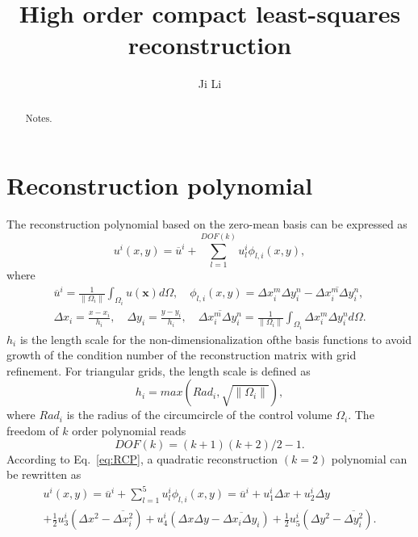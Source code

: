 \documentclass[review]{elsarticle}
\begin{document}
\begin{frontmatter}
	
\title{High order compact least-squares reconstruction}
\author{Ji Li}


\address{National Key Laboratory of Science and Technology on Aerodynamic Design and Research, Northwestern Polytechnical 
University, Xi'an, Shaanxi 710072, China}

\begin{abstract}
	Notes.
\end{abstract}
\end{frontmatter}

\section{Reconstruction polynomial}
The reconstruction polynomial based on the zero-mean basis can be expressed as 
\begin{equation}\label{eq:RCP}
	u^i(x,y)=\overline{u}^i+\sum_{l=1}^{DOF(k)}u^i_l\phi_{l,i}(x, y),
\end{equation}
where 
\begin{equation*}
	\begin{gathered}
		\overline{u}^i=\frac{1}{\|\Omega_i\|}\int_{\Omega_i}u(\bm{x})d\Omega,
		\quad \phi_{l,i}(x,y)=\Delta x^m_i\Delta y^n_i-\overline{\Delta x^m_i\Delta y^n_i},\\
		\Delta x_i=\frac{x-x_i}{h_i},\quad \Delta y_i=\frac{y-y_i}{h_i}, \quad 
		\overline{\Delta x^m_i\Delta y^n_i}=\frac{1}{\|\Omega_i\|}\int_{\Omega_i}\Delta x^m_i\Delta y^n_id\Omega.
	\end{gathered}
\end{equation*}
$h_i$ is the length scale for the non-dimensionalization ofthe basis functions to avoid growth of the condition number of the reconstruction matrix with grid refinement. For triangular grids, the length scale is defined as
\begin{equation}\label{eq:h}
	h_i=max(Rad_i, \sqrt{\|\Omega_i\|}),
\end{equation}
where $Rad_i$ is the radius of the circumcircle of the control volume $\Omega_i$. The freedom of $k$ order polynomial reads
\begin{equation}\label{dof_k}
	DOF(k)=\left(k+1\right)\left(k+2\right)/2-1.
\end{equation} 
According to Eq.~\eqref{eq:RCP}, a quadratic reconstruction $(k=2)$ polynomial can be rewritten as
\begin{equation}\label{eq:quadRCP}
	\begin{gathered}
		u^i(x,y)=\overline{u}^i+\sum_{l=1}^{5}u^i_l\phi_{l,i}(x, y)=\overline{u}^i+u^i_1\Delta x+u^i_2\Delta y\\
		+\frac{1}{2}u^i_3\left(\Delta x^2 - \overline{\Delta x^2_i}\right)
		+u^i_4\left(\Delta x\Delta y - \overline{\Delta x_i\Delta y_i}\right)
		+\frac{1}{2}u^i_5\left(\Delta y^2 - \overline{\Delta y^2_i}\right).
	\end{gathered}
\end{equation}
\end{document}
